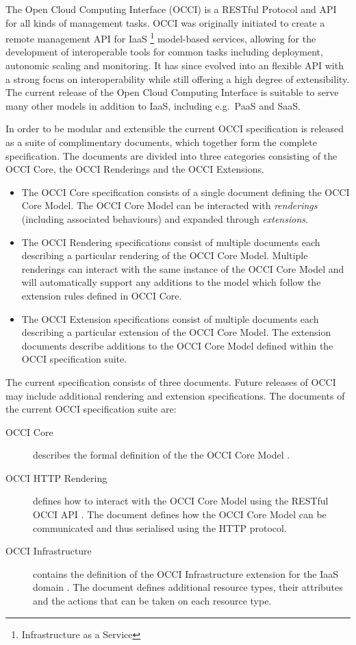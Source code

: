 The Open Cloud Computing Interface (OCCI) is a RESTful Protocol and
API for all kinds of management tasks. OCCI was originally initiated
to create a remote management API for IaaS%
\footnote{Infrastructure as a Service}
model-based services, allowing for the development of interoperable tools for
common tasks including deployment, autonomic scaling and monitoring.
%
It has since evolved into an flexible API with a strong focus on
interoperability while still offering a high degree of extensibility. The
current release of the Open Cloud Computing Interface is suitable to serve many
other models in addition to IaaS, including e.g.~PaaS and SaaS.

In order to be modular and extensible the current OCCI specification is
released as a suite of complimentary documents, which together form the complete
specification.
%
The documents are divided into three categories consisting of the OCCI Core,
the OCCI Renderings and the OCCI Extensions.
%
\begin{itemize}
\item The OCCI Core specification consists of a single document defining the
 OCCI Core Model. The OCCI Core Model can be interacted with {\em
 renderings} (including associated behaviours) and expanded through {\em extensions}.
\item The OCCI Rendering specifications consist of multiple documents each
 describing a particular rendering of the OCCI Core Model. Multiple renderings can
 interact with the same instance of the OCCI Core Model and will automatically support
 any additions to the model which follow the extension rules defined in OCCI
 Core.
\item The OCCI Extension specifications consist of multiple documents each
 describing a particular extension of the OCCI Core Model. The extension documents
 describe additions to the OCCI Core Model defined within the OCCI specification
 suite.
\end{itemize}
%
The current specification consists of three documents.
Future releases of OCCI may include additional rendering and extension
specifications. The documents of the current OCCI specification suite are:

\begin{description}
\item[OCCI Core] describes the formal definition of the the OCCI Core Model
\cite{occi:core}.
\item[OCCI HTTP Rendering] defines how to interact with the OCCI Core Model using the
RESTful OCCI API \cite{occi:http_rendering}. The document defines how the OCCI Core Model can
be communicated and thus serialised using the HTTP protocol.
\item[OCCI Infrastructure] contains the definition of the OCCI Infrastructure
extension for the IaaS domain \cite{occi:infrastructure}. The document defines
additional resource types, their attributes and the actions that can be taken
on each resource type.
\end{description}
